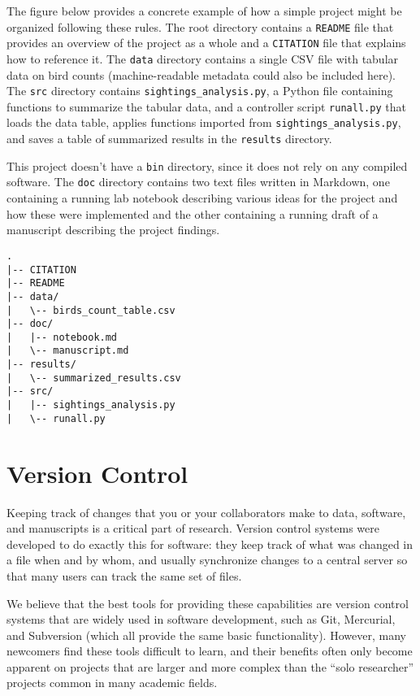 \documentclass[10pt]{article}
\begin{document}
The figure below provides a concrete example of how a simple project
might be organized following these rules. The root directory contains a
\texttt{README} file that provides an overview of the project as a whole
and a \texttt{CITATION} file that explains how to reference it. The
\texttt{data} directory contains a single CSV file with tabular data on
bird counts (machine-readable metadata could also be included here). The
\texttt{src} directory contains \texttt{sightings\_analysis.py}, a
Python file containing functions to summarize the tabular data, and a
controller script \texttt{runall.py} that loads the data table, applies
functions imported from \texttt{sightings\_analysis.py}, and saves a
table of summarized results in the \texttt{results} directory.

This project doesn't have a \texttt{bin} directory, since it does not
rely on any compiled software. The \texttt{doc} directory contains two
text files written in Markdown, one containing a running lab notebook
describing various ideas for the project and how these were implemented
and the other containing a running draft of a manuscript describing the
project findings.

\begin{verbatim}
.
|-- CITATION
|-- README
|-- data/
|   \-- birds_count_table.csv
|-- doc/
|   |-- notebook.md
|   \-- manuscript.md
|-- results/
|   \-- summarized_results.csv
|-- src/
|   |-- sightings_analysis.py
|   \-- runall.py
\end{verbatim}

\section{Version Control}\label{version-control}

Keeping track of changes that you or your collaborators make to data,
software, and manuscripts is a critical part of research. Version
control systems were developed to do exactly this for software: they
keep track of what was changed in a file when and by whom, and usually
synchronize changes to a central server so that many users can track the
same set of files.

We believe that the best tools for providing these capabilities are
version control systems that are widely used in software development,
such as Git, Mercurial, and Subversion (which all provide the same basic
functionality). However, many newcomers find these tools difficult to
learn, and their benefits often only become apparent on projects that
are larger and more complex than the ``solo researcher'' projects common
in many academic fields.
\end{document}
